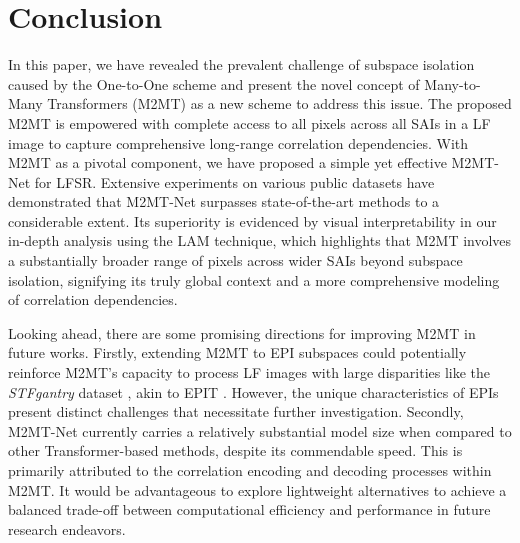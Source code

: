 \section{Conclusion}
In this paper, we have revealed the prevalent challenge of subspace isolation caused by the One-to-One scheme and present the novel concept of Many-to-Many Transformers (M2MT) as a new scheme to address this issue. The proposed M2MT is empowered with complete access to all pixels across all SAIs in a LF image to capture comprehensive long-range correlation dependencies. With M2MT as a pivotal component, we have proposed a simple yet effective M2MT-Net for LFSR. Extensive experiments on various public datasets have demonstrated that M2MT-Net surpasses state-of-the-art methods to a considerable extent. Its superiority is evidenced by visual interpretability in our in-depth analysis using the LAM technique, which highlights that M2MT involves a substantially broader range of pixels across wider SAIs beyond subspace isolation, signifying its truly global context and a more comprehensive modeling of correlation dependencies.

Looking ahead, there are some promising directions for improving M2MT in future works. Firstly, extending M2MT to EPI subspaces could potentially reinforce M2MT's capacity to process LF images with large disparities like the \textit{STFgantry} dataset \cite{vaishSTFgantry_2008}, akin to EPIT \cite{liangEPIT_arXiv2023}. However, the unique characteristics of EPIs present distinct challenges that necessitate further investigation. Secondly, M2MT-Net currently carries a relatively substantial model size when compared to other Transformer-based methods, despite its commendable speed. This is primarily attributed to the correlation encoding and decoding processes within M2MT. It would be advantageous to explore lightweight alternatives to achieve a balanced trade-off between computational efficiency and performance in future research endeavors.